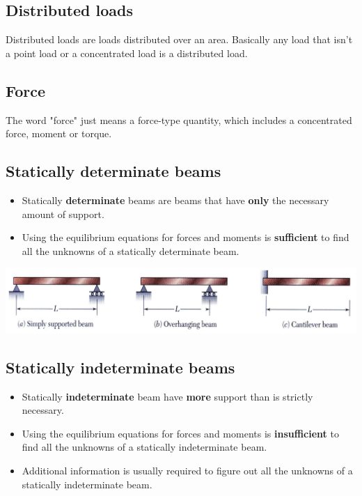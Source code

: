\documentclass[11pt]{article}
\begin{document}
\subsection{Distributed loads}
\label{sec:org86e30f0}
Distributed loads are loads distributed over an area. Basically any load that isn't a point load or a concentrated load is a distributed load.
\subsection{Force}
\label{sec:orgbe63746}
The word "force" just means a force-type quantity, which includes a concentrated force, moment or torque.
\subsection{Statically determinate beams}
\label{sec:org43c416c}
\begin{itemize}
\item Statically \textbf{determinate} beams are beams that have \textbf{only} the necessary amount of support.
\item Using the equilibrium equations for forces and moments is \textbf{sufficient} to find all the unknowns of a statically determinate beam.
\end{itemize}

\begin{center}
\includegraphics[width=.9\linewidth]{./images/statically-determinate-beams.png}
\end{center}
\subsection{Statically indeterminate beams}
\label{sec:org75d87cf}
\begin{itemize}
\item Statically \textbf{indeterminate} beam have \textbf{more} support than is strictly necessary.
\item Using the equilibrium equations for forces and moments is \textbf{insufficient} to find all the unknowns of a statically indeterminate beam.
\item Additional information is usually required to figure out all the unknowns of a statically indeterminate beam.
\end{itemize}
\end{document}
